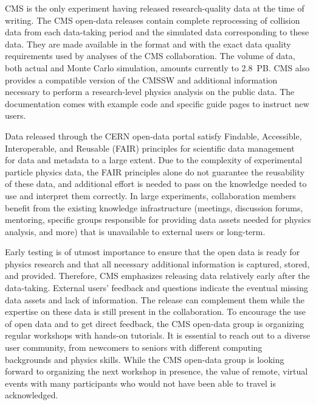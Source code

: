 \documentclass[11pt]{article}
\begin{document}
CMS is the only experiment having released research-quality data at the time of writing. The CMS open-data releases contain complete reprocessing of collision data from each data-taking period and the simulated data corresponding to these data. They are made available in the format and with the exact data quality requirements used by analyses of the CMS collaboration. The volume of data, both actual and Monte Carlo simulation, amounts currently to 2.8~PB. CMS also provides a compatible version of the CMSSW and additional information necessary to perform a research-level physics analysis on the public data. The documentation comes with example code and specific guide pages to instruct new users.

Data released through the CERN open-data portal satisfy Findable, Accessible, Interoperable, and Reusable (FAIR) principles for scientific data management~\cite{FAIR-paper} for data and metadata to a large extent. Due to the complexity of experimental particle physics data, the FAIR principles alone do not guarantee the reusability of these data, and additional effort is needed to pass on the knowledge needed to use and interpret them correctly. In large experiments, collaboration members benefit from the existing knowledge infrastructure (meetings, discussion forums, mentoring, specific groups responsible for providing data assets needed for physics analysis, and more) that is unavailable to external users or long-term. 


Early testing is of utmost importance to ensure that the open data is ready for physics research and that all necessary additional information is captured, stored, and provided. Therefore, CMS emphasizes releasing data relatively early after the data-taking. External users' feedback and questions indicate the eventual missing data assets and lack of information. The release can complement them while the expertise on these data is still present in the collaboration. To encourage the use of open data and to get direct feedback, the CMS open-data group is organizing regular workshops with hands-on tutorials. It is essential to reach out to a diverse user community, from newcomers to seniors with different computing backgrounds and physics skills. While the CMS open-data group is looking forward to organizing the next workshop in presence, the value of remote, virtual events with many participants who would not have been able to travel is acknowledged.
\end{document}
